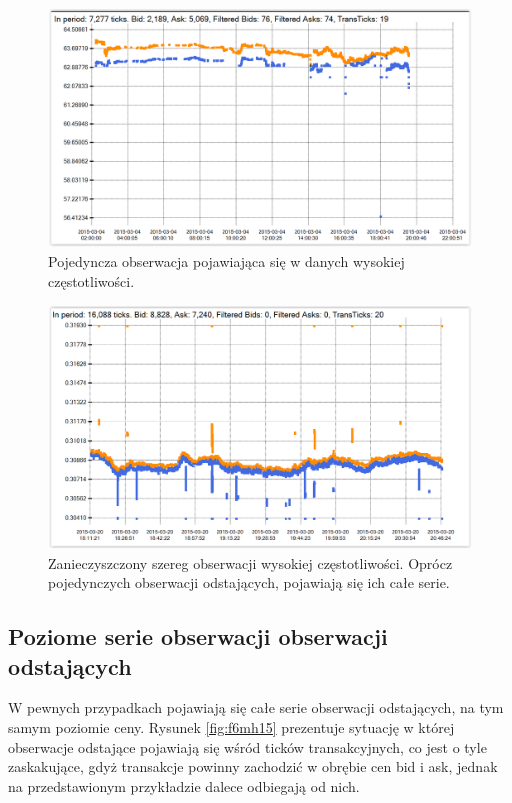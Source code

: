 \documentclass[a4paper,12pt,openany, DIV=calc, headsepline]{scrbook}
\begin{document}
\begin{figure}[H]
  \centering
  \includegraphics[scale=0.5]{wykresy/singleCT.PNG}
  \caption{Pojedyncza obserwacja pojawiająca się w danych wysokiej częstotliwości.}
  \label{fig:singleCT}
\end{figure}

\begin{figure}[H]
  \centering
  \includegraphics[scale=0.5]{wykresy/f6LJ15.PNG}
  \caption{Zanieczyszczony szereg obserwacji wysokiej częstotliwości. Oprócz pojedynczych obserwacji odstających, pojawiają się ich całe serie.}
  \label{fig:f6LJ15}
\end{figure}

\subsection{Poziome serie obserwacji obserwacji odstających}

W pewnych przypadkach pojawiają się całe serie obserwacji odstających, na tym samym poziomie ceny. Rysunek \ref{fig:f6mh15} prezentuje sytuację w której obserwacje odstające pojawiają się wśród ticków transakcyjnych, co jest o tyle zaskakujące, gdyż transakcje powinny zachodzić w obrębie cen bid i ask, jednak na przedstawionym przykładzie dalece odbiegają od nich.
\end{document}
